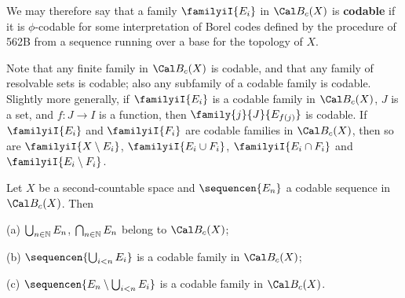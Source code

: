 We may therefore say that a family $\familyiI{E_i}$ in $\Cal B_c(X)$ is
{\bf codable} if it is $\phi$-codable for some
interpretation of Borel codes defined by the procedure of 562B from a
sequence running over a base for the topology of $X$.

Note that any finite family in $\Cal B_c(X)$ is codable, and that any
family of resolvable sets is codable;  also any subfamily of a codable family
is codable.   Slightly more generally, if
$\familyiI{E_i}$ is a codable family in $\Cal B_c(X)$, $J$ is a set, and
$f:J\to I$ is a function, then $\family{j}{J}{E_{f(j)}}$ is codable.
If $\familyiI{E_i}$ and
$\familyiI{F_i}$ are codable families in $\Cal B_c(X)$, then so are
$\familyiI{X\setminus E_i}$,
$\familyiI{E_i\cup F_i}$, $\familyiI{E_i\cap F_i}$ and
$\familyiI{E_i\setminus F_i}$.

 Let $X$ be a second-countable space and
$\sequencen{E_n}$ a codable sequence in $\Cal B_c(X)$.   Then

(a) $\bigcup_{n\in\Bbb N}E_n$, $\bigcap_{n\in\Bbb N}E_n$ belong to
$\Cal B_c(X)$;

(b) $\sequencen{\bigcup_{i<n}E_i}$ is a codable family in $\Cal B_c(X)$;

(c) $\sequencen{E_n\setminus\bigcup_{i<n}E_i}$ is a codable family in
$\Cal B_c(X)$.

